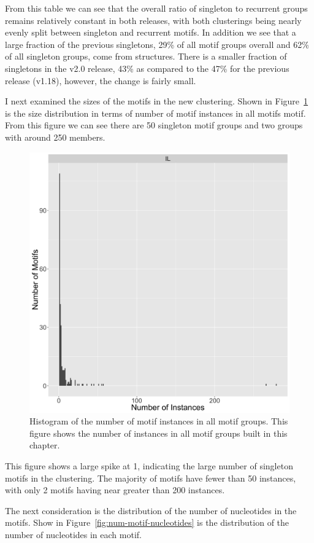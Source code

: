 From this table we can see that the overall ratio of singleton to recurrent
groups remains relatively constant in both releases, with both clusterings being
nearly evenly split between singleton and recurrent motifs. In addition we see
that a large fraction of the previous singletons, 29\% of all motif groups
overall and 62\% of all singleton groups, come from \cyem{} structures. There is
a smaller fraction of singletons in the v2.0 release, 43\% as compared to the
47\% for the previous release (v1.18), however, the change is fairly small.

I next examined the sizes of the motifs in the new clustering. Shown in
Figure~\ref{fig:num-motif-instances} is the size distribution in terms of number
of motif instances in all motifs motif. From this figure we can see there are 50
singleton motif groups and two groups with around 250 members.

\begin{figure}
  \includegraphics[width=0.5\linewidth]{chapter-5/figs/motifs/instances}
  \caption{Histogram of the number of motif instances in all motif groups. This
  figure shows the number of instances in all motif groups built in this chapter.}
\label{fig:num-motif-instances}
\end{figure}

This figure shows a large spike at 1, indicating the large number of singleton
motifs in the clustering. The majority of motifs have fewer than 50 instances,
with only 2 motifs having near greater than 200 instances.

The next consideration is the distribution of the number of nucleotides in the
motifs. Show in Figure~\ref{fig:num-motif-nucleotides} is the distribution of
the number of nucleotides in each motif.

